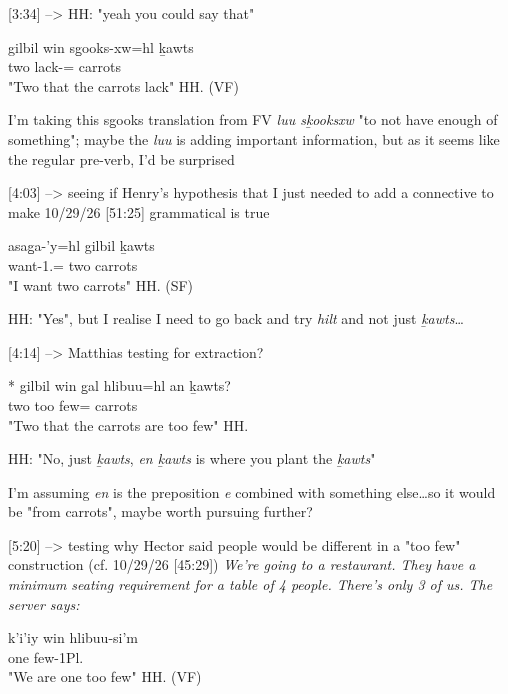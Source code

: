 [3:34] --> HH: "yeah you could say that"
\begin{exe}
\ex \gll
gilbil win sg̱ooks-xw=hl ḵawts \\
two \Comp{} lack-\Val{}=\Cn{} carrots \\
\glt "Two that the carrots lack" \hfill HH.\ElicitationDate{} (VF)
\end{exe}

I'm taking this sg̱ooks translation from FV \textit{luu sḵooksxw} "to not have enough of something"; maybe the \textit{luu} is adding important information, but as it seems like the regular pre-verb, I'd be surprised

[4:03] --> seeing if Henry's hypothesis that I just needed to add a connective to make 10/29/26 [51:25] grammatical is true
\begin{exe}
\ex \gll
asag̱a-'y=hl gilbil ḵawts \\
want-1.\Ii{}=\Cn{} two carrots\\
\glt "I want two carrots" \hfill HH.\ElicitationDate{} (SF)
\end{exe}

HH: "Yes", but I realise I need to go back and try \textit{hilt} and not just \textit{ḵawts}\dots

[4:14] --> Matthias testing for extraction?
\begin{exe}
\ex \gll
* gilbil win g̱al hlibuu=hl an ḵawts?\\
{} two \Comp{} too few=\Cn{} \Ax{} carrots\\
\glt "Two that the carrots are too few" \hfill HH.\ElicitationDate{}
\end{exe}

HH: "No, just \textit{ḵawts}, \textit{en ḵawts} is where you plant the \textit{ḵawts}"

I'm assuming \textit{en} is the preposition \textit{e} combined with something else\dots so it would be "from carrots", maybe worth pursuing further?

[5:20] --> testing why Hector said people would be different in a "too few" construction (cf. 10/29/26 [45:29]) \textit{We're going to a restaurant. They have a minimum seating requirement for a table of 4 people. There’s only 3 of us. The server says:}
\begin{exe}
\ex \gll
k'i'iy win hlibuu-si'm \\
one \Comp{} few-1Pl.\Ii{} \\
\glt "We are one too few" \hfill HH.\ElicitationDate{} (VF)
\end{exe}

